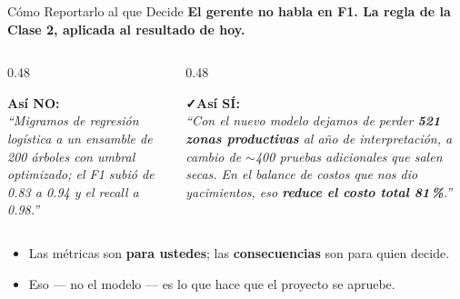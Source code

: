 \documentclass[aspectratio=169, 11pt]{beamer}
\begin{document}
\begin{frame}[shrink=8]{Cómo Reportarlo al que Decide}
  \vspace{-4pt}
  {\small\color{arcaDark}\bfseries
    El gerente no habla en F1. La regla de la Clase 2, aplicada al resultado de hoy.}

  \vspace{8pt}
  \begin{columns}[T]
    \begin{column}{0.48\textwidth}
      \begin{tcolorbox}[colback=arcaGray, colframe=arcaRed, boxrule=0pt, leftrule=3pt,
        arc=3pt, left=6pt, right=6pt, top=5pt, bottom=5pt]
        {\scriptsize\color{arcaRed}\bfseries\faTimes\hspace{4pt}Así NO:}\\[4pt]
        {\scriptsize\color{textMuted}\itshape
          ``Migramos de regresión logística a un ensamble
          de 200 árboles con umbral optimizado; el F1
          subió de 0.83 a 0.94 y el recall a 0.98.''}
      \end{tcolorbox}
    \end{column}
    \begin{column}{0.48\textwidth}
      \begin{tcolorbox}[colback=arcaGray, colframe=codeGreen, boxrule=0pt, leftrule=3pt,
        arc=3pt, left=6pt, right=6pt, top=5pt, bottom=5pt]
        {\scriptsize\color{codeGreen}\bfseries\faCheck\hspace{4pt}Así SÍ:}\\[4pt]
        {\scriptsize\color{textMuted}\itshape
          ``Con el nuevo modelo dejamos de perder
          \textbf{521 zonas productivas} al año de interpretación,
          a cambio de \(\sim\)400 pruebas adicionales que salen
          secas. En el balance de costos que nos dio
          yacimientos, eso \textbf{reduce el costo total 81\,\%}.''}
      \end{tcolorbox}
    \end{column}
  \end{columns}

  \vspace{10pt}
  {\footnotesize\color{textMuted}
  \begin{itemize}\setlength{\itemsep}{4pt}
    \item[{\color{arcaRed}\scriptsize\faArrowRight}]
      Las métricas son \textbf{para ustedes}; las \textbf{consecuencias} son para quien decide.
    \item[{\color{codeGreen}\scriptsize\faCheck}]
      Eso --- no el modelo --- es lo que hace que el proyecto se apruebe.
  \end{itemize}
  }
\end{frame}
\end{document}
